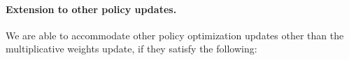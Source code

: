 






\paragraph{Extension to other policy updates.} We are able to accommodate other policy optimization updates other than the multiplicative weights update, if they satisfy the following:

